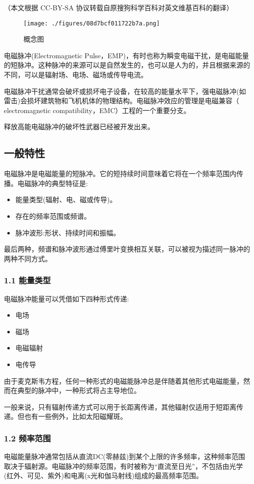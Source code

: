 
（本文根据 CC-BY-SA 协议转载自原搜狗科学百科对英文维基百科的翻译）
\begin{figure}[ht]
\centering
\texttt{[image: ./figures/08d7bcf011722b7a.png]}
\caption{概念图} \label{fig_DCMC_4}
\end{figure}
电磁脉冲(Electromagnetic Pulse，EMP)，有时也称为瞬变电磁干扰，是电磁能量的短脉冲。这种脉冲的来源可以是自然发生的，也可以是人为的，并且根据来源的不同，可以是辐射场、电场、磁场或传导电流。

电磁脉冲干扰通常会破坏或损坏电子设备，在较高的能量水平下，强电磁脉冲(如雷击)会损坏建筑物和飞机机体的物理结构。电磁脉冲效应的管理是电磁兼容（ electromagnetic compatibility，EMC）工程的一个重要分支。

释放高能电磁脉冲的破坏性武器已经被开发出来。

\subsection{一般特性}
电磁脉冲是电磁能量的短脉冲。它的短持续时间意味着它将在一个频率范围内传播。电磁脉冲的典型特征是:
\begin{itemize}
\item 能量类型(辐射、电、磁或传导)。
\item 存在的频率范围或频谱。
\item 脉冲波形:形状、持续时间和振幅。
\end{itemize}
最后两种，频谱和脉冲波形通过傅里叶变换相互关联，可以被视为描述同一脉冲的两种不同方式。
\subsubsection{1.1 能量类型}
电磁脉冲能量可以凭借如下四种形式传递:
\begin{itemize}
\item 电场
\item 磁场
\item 电磁辐射
\item 电传导
\end{itemize}
由于麦克斯韦方程，任何一种形式的电磁能脉冲总是伴随着其他形式电磁能量，然而在典型的脉冲中，一种形式将占主导地位。

一般来说，只有辐射传递方式可以用于长距离传递，其他辐射仅适用于短距离传递。但也有一些例外，比如太阳磁耀斑。
\subsubsection{1.2 频率范围}
电磁能量脉冲通常包括从直流DC(零赫兹)到某个上限的许多频率，这种频率范围取决于辐射源。电磁脉冲的频率范围，有时被称为“直流至日光”，不包括由光学(红外、可见、紫外)和电离(x光和伽马射线)组成的最高频率范围。

